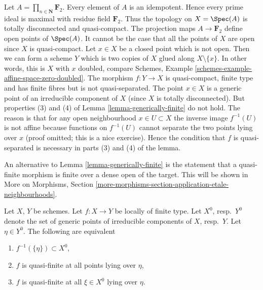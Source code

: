 \begin{example}
\label{example-counter-generically-finite}
Let $A = \prod_{n \in \mathbf{N}} \mathbf{F}_2$.
Every element of $A$ is an idempotent. Hence every prime ideal is maximal
with residue field $\mathbf{F}_2$.
Thus the topology on $X = \Spec(A)$ is totally disconnected
and quasi-compact. The projection maps $A \to \mathbf{F}_2$ define open
points of $\Spec(A)$. It cannot be the case that all the points
of $X$ are open since $X$ is quasi-compact. Let $x \in X$ be a closed
point which is not open. Then we can form a scheme $Y$ which is two
copies of $X$ glued along $X \setminus \{x\}$. In other words, this
is $X$ with $x$ doubled, compare
Schemes, Example \ref{schemes-example-affine-space-zero-doubled}.
The morphism
$f : Y \to X$ is quasi-compact, finite type and has finite fibres
but is not quasi-separated.
The point $x \in X$ is a generic point of an irreducible component
of $X$ (since $X$ is totally disconnected). But properties (3) and (4)
of Lemma \ref{lemma-generically-finite} do not hold. The reason is that
for any open neighbourhood $x \in U \subset X$ the inverse image
$f^{-1}(U)$ is not affine because functions on $f^{-1}(U)$ cannot
separate the two points lying over $x$ (proof omitted; this is a
nice exercise). Hence the condition that $f$ is quasi-separated is
necessary in parts (3) and (4) of the lemma.
\end{example}

\begin{remark}
\label{remark-quasi-finite-finite-over-dense-open}
An alternative to
Lemma \ref{lemma-generically-finite}
is the statement that a quasi-finite morphism is finite
over a dense open of the target. This will be shown in
More on Morphisms,
Section \ref{more-morphisms-section-application-etale-neighbourhoods}.
\end{remark}

\begin{lemma}
\label{lemma-quasi-finiteness-over-generic-point}
Let $X$, $Y$ be schemes. Let $f : X \to Y$ be locally of finite type.
Let $X^0$, resp.\ $Y^0$ denote the set of generic points of irreducible
components of $X$, resp.\ $Y$. Let $\eta \in Y^0$. The following are
equivalent
\begin{enumerate}
\item $f^{-1}(\{\eta\}) \subset X^0$,
\item $f$ is quasi-finite at all points lying over $\eta$,
\item $f$ is quasi-finite at all $\xi \in X^0$ lying over $\eta$.
\end{enumerate}
\end{lemma}

